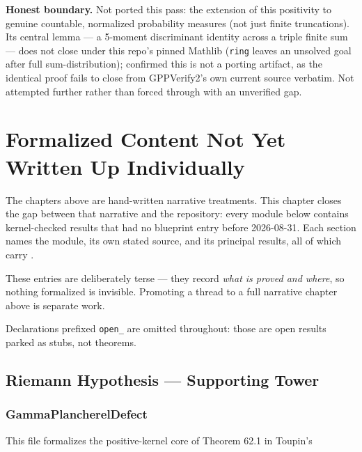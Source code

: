 \documentclass{report}
\theoremstyle{definition}
\begin{document}
\textbf{Honest boundary.} Not ported this pass: the extension of this positivity to
genuine countable, normalized probability measures (not just finite truncations). Its
central lemma --- a 5-moment discriminant identity across a triple finite sum --- does not
close under this repo's pinned Mathlib (\texttt{ring} leaves an unsolved goal after full
sum-distribution); confirmed this is not a porting artifact, as the identical proof fails
to close from GPPVerify2's own current source verbatim. Not attempted further rather than
forced through with an unverified gap.

\chapter{Formalized Content Not Yet Written Up Individually}

The chapters above are hand-written narrative treatments. This chapter closes the gap
between that narrative and the repository: every module below contains kernel-checked
results that had no blueprint entry before 2026-08-31. Each section names the module, its
own stated source, and its principal results, all of which carry \leanok.

These entries are deliberately terse --- they record \emph{what is proved and where},
so nothing formalized is invisible. Promoting a thread to a full narrative chapter above
is separate work.

Declarations prefixed \texttt{open\_} are omitted throughout: those are open results
parked as stubs, not theorems.

\section{Riemann Hypothesis --- Supporting Tower}

\subsection{GammaPlancherelDefect}
This file formalizes the positive-kernel core of Theorem 62.1 in Toupin's
\end{document}
